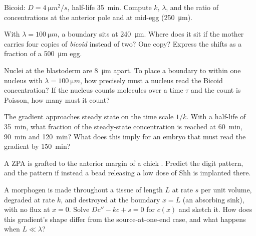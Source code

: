 \begin{exercise}[$\star\star$]\label{exo:b3:developmental-genetics:5}
Bicoid: $D = \qty{4}{\micro m^2/s}$, half-life \qty{35}{min}. Compute
$k$, $\lambda$, and the ratio of concentrations at the anterior pole and
at mid-egg (\qty{250}{\micro m}).
\end{exercise}

\begin{exercise}[$\star\star$]\label{exo:b3:developmental-genetics:6}
With $\lambda = \qty{100}{\micro m}$, a boundary sits at
\qty{240}{\micro m}. Where does it sit if the mother carries four copies
of \emph{bicoid} instead of two? One copy? Express the shifts as a
fraction of a \qty{500}{\micro m} egg.
\end{exercise}

\begin{exercise}[$\star\star$]\label{exo:b3:developmental-genetics:7}
Nuclei at the blastoderm are \qty{8}{\micro m} apart. To place a
boundary to within one nucleus with $\lambda = \qty{100}{\micro m}$,
how precisely must a nucleus read the Bicoid concentration? If the
nucleus counts molecules over a time $\tau$ and the count is Poisson,
how many must it count?
\end{exercise}

\begin{exercise}[$\star\star$]\label{exo:b3:developmental-genetics:8}
The gradient approaches steady state on the time scale $1/k$. With a
half-life of \qty{35}{min}, what fraction of the steady-state
concentration is reached at \qty{60}{min}, \qty{90}{min} and
\qty{120}{min}? What does this imply for an embryo that must read the
gradient by \qty{150}{min}?
\end{exercise}

\begin{exercise}[$\star\star$]\label{exo:b3:developmental-genetics:9}
A ZPA is grafted to the anterior margin of a chick . Predict
the digit pattern, and the pattern if instead a bead releasing a low
dose of Shh is implanted there.
\end{exercise}

\begin{exercise}[$\star\star\star$]\label{exo:b3:developmental-genetics:10}
A morphogen is made throughout a tissue of length $L$ at rate $s$ per
unit volume, degraded at rate $k$, and destroyed at the boundary $x =
L$ (an absorbing sink), with no flux at $x = 0$. Solve $Dc'' - kc + s =
0$ for $c(x)$ and sketch it. How does this gradient's shape differ from
the source-at-one-end case, and what happens when $L \ll \lambda$?
\end{exercise}

